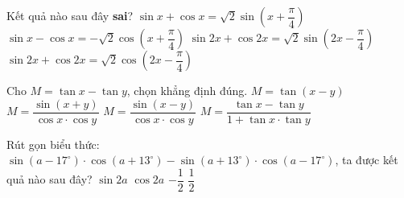 \begin{ex}%
	 Kết quả nào sau đây \textbf{sai}?
	\choice 
		 {$\sin x+\cos x=\sqrt{2} \sin \left(x+\dfrac{\pi}{4}\right)$}
		 {$\sin x-\cos x=-\sqrt{2} \cos \left(x+\dfrac{\pi}{4}\right)$}
		{\True $\sin 2 x+\cos 2 x=\sqrt{2}  \sin \left(2 x-\dfrac{\pi}{4}\right)$}
		 {$\sin 2 x+\cos 2 x=\sqrt{2} \cos \left(2 x-\dfrac{\pi}{4}\right)$}
\end{ex}

\begin{ex}%
	Cho $M=\tan x-\tan  y$, chọn khẳng định đúng.
	 \choice
		{$M=\tan \left(x-y\right)$} 
		 {$M=\dfrac{\sin \left(x+y\right)}{\cos x\cdot \cos y}$}
		{\True $M=\dfrac{\sin \left(x-y\right)}{\cos x\cdot \cos  y}$}
		{$M=\dfrac{\tan x-\tan y}{1+\tan  x\cdot \tan y}$}
\end{ex}

\begin{ex}%
	Rút gọn biểu thức: $\sin \left(a-17^{\circ} \right)\cdot \cos  \left(a+13^{\circ} \right)-\sin \left(a+13^{\circ} \right)\cdot \cos \left(a-17^{\circ} \right)$,
	ta được kết  quả nào sau đây?
	\choice 
		{$\sin 2a$} 
		{$\cos  2a$}
		{\True  $-\dfrac{1}{2}$}
		 {$\dfrac{1}{2}$}
\end{ex}

